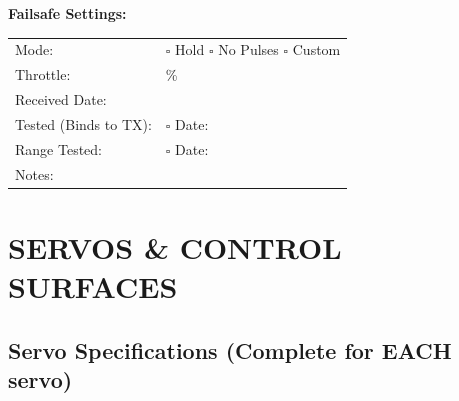 \documentclass[10pt,letterpaper]{article}
\begin{document}
\textbf{Failsafe Settings:}
\begin{tabularx}{\textwidth}{lX}
Mode: & $\square$ Hold $\square$ No Pulses $\square$ Custom \\
Throttle: & \underline{\hspace{4cm}} \% \\[0.5em]
Received Date: & \underline{\hspace{4cm}} \\
Tested (Binds to TX): & $\square$ \quad Date: \underline{\hspace{3cm}} \\
Range Tested: & $\square$ \quad Date: \underline{\hspace{3cm}} \\
Notes: & \underline{\hspace{10cm}} \\
\end{tabularx}

\newpage

\section*{SERVOS \& CONTROL SURFACES}

\subsection*{Servo Specifications (Complete for EACH servo)}
\end{document}
